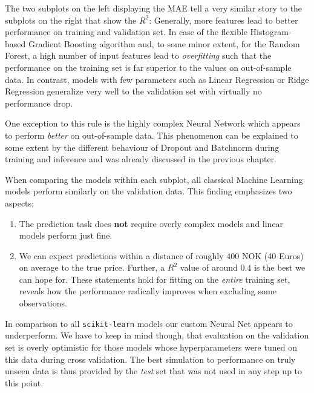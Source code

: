 The two subplots on the left displaying the MAE tell a very similar story to the subplots on the right that show the $R^2$:
Generally, more features lead to better performance on training and validation set.
In case of the flexible Histogram-based Gradient Boosting algorithm and, to some minor extent, for the Random Forest, a high number of input features lead to \emph{overfitting} such that the performance on the training set is far superior to the values on out-of-sample data.
In contrast, models with few parameters such as Linear Regression or Ridge Regression generalize very well to the validation set with virtually no performance drop.

One exception to this rule is the highly complex Neural Network which appears to perform \emph{better} on out-of-sample data.
This phenomenon can be explained to some extent by the different behaviour of Dropout and Batchnorm during training and inference and was already discussed in the previous chapter.

When comparing the models within each subplot, all classical Machine Learning models perform similarly on the validation data.
This finding emphasizes two aspects:
\begin{enumerate}
  \item The prediction task does \textbf{not} require overly complex models and linear models perform just fine.
  \item We can expect predictions within a distance of roughly $400$ NOK (40 Euros) on average to the true price.
        Further, a $R^2$ value of around $0.4$ is the best we can hope for.
        These statements hold for fitting on the \emph{entire} training set,  reveals how the performance radically improves when excluding some observations.
\end{enumerate}
In comparison to all \texttt{scikit-learn} models our custom Neural Net appears to underperform.
We have to keep in mind though, that evaluation on the validation set is overly optimistic for those models whose hyperparameters were tuned on this data during cross validation.
The best simulation to performance on truly unseen data is thus provided by the \emph{test} set that was not used in any step up to this point.

